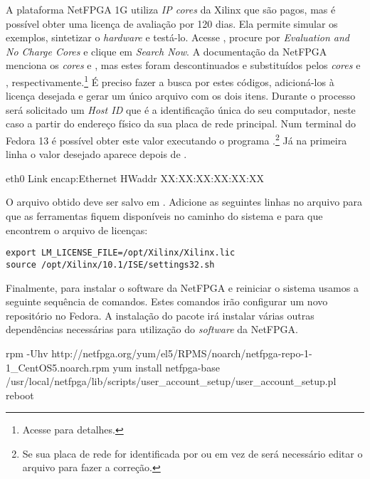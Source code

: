 A plataforma NetFPGA 1G utiliza \emph{IP cores} da Xilinx que são pagos,
mas é possível obter uma licença de avaliação por 120 dias. Ela permite
simular os exemplos, sintetizar o \emph{hardware} e testá-lo. Acesse
, procure por \emph{Evaluation
and No Charge Cores} e clique em \emph{Search Now}. A documentação da
NetFPGA menciona os \emph{cores}  e
, mas estes foram descontinuados e substituídos pelos
\emph{cores}  e ,
respectivamente.\footnote{Acesse
para detalhes.} É preciso fazer a busca por estes códigos, adicioná-los
à licença desejada e gerar um único arquivo com os dois itens. Durante o
processo será solicitado um \emph{Host ID} que é a identificação única
do seu computador, neste caso a partir do endereço físico da sua placa
de rede principal. Num terminal do Fedora 13 é possível obter este valor
executando o programa .\footnote{Se sua placa de rede for
identificada por  ou  em vez de  será
necessário editar o arquivo
 para fazer a correção.}
Já na primeira linha o valor desejado aparece depois de .

\begin{verbnobox}[\small]
eth0      Link encap:Ethernet  HWaddr XX:XX:XX:XX:XX:XX
\end{verbnobox}

O arquivo obtido deve ser salvo em .
Adicione as seguintes linhas no arquivo  para que as
ferramentas fiquem disponíveis no caminho do sistema e para que
encontrem o arquivo de licenças:

\begin{verbatim}
export LM_LICENSE_FILE=/opt/Xilinx/Xilinx.lic
source /opt/Xilinx/10.1/ISE/settings32.sh
\end{verbatim}

Finalmente, para instalar o software da NetFPGA e reiniciar o sistema
usamos a seguinte sequência de comandos.  Estes comandos irão configurar
um novo repositório no Fedora.  A instalação do pacote
 irá instalar várias outras dependências necessárias
para utilização do \emph{software} da NetFPGA.

\begin{verbnobox}[\small]
rpm -Uhv http://netfpga.org/yum/el5/RPMS/noarch/netfpga-repo-1-1_CentOS5.noarch.rpm
yum install netfpga-base
/usr/local/netfpga/lib/scripts/user_account_setup/user_account_setup.pl
reboot
\end{verbnobox}

